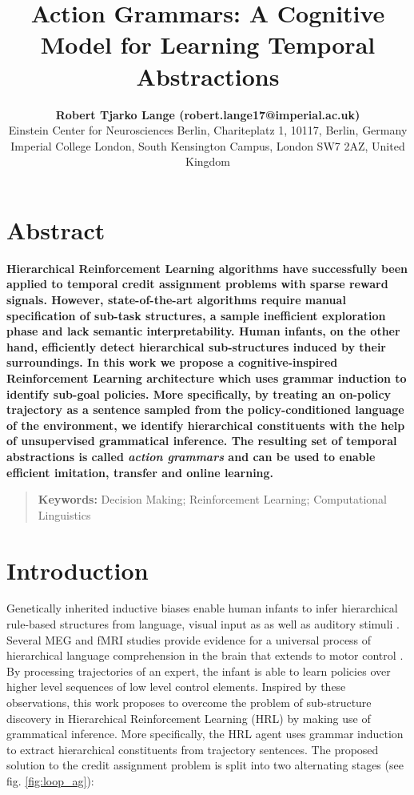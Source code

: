 \documentclass[10pt,letterpaper]{article}
\title{Action Grammars: A Cognitive Model for Learning Temporal Abstractions}
\author{{\large \bf Robert Tjarko Lange (robert.lange17@imperial.ac.uk)} \\
  Einstein Center for Neurosciences Berlin, Chariteplatz 1, 10117, Berlin, Germany \AND {\large \bf Aldo Faisal (a.faisal@imperial.ac.uk)} \\
  Imperial College London, South Kensington Campus, London SW7 2AZ, United Kingdom}
\begin{document}
\maketitle


\section{Abstract}
{
\bf
Hierarchical Reinforcement Learning algorithms have successfully been applied to temporal credit assignment problems with sparse reward signals. However, state-of-the-art algorithms require manual specification of sub-task structures, a sample inefficient exploration phase and lack semantic interpretability. Human infants, on the other hand, efficiently detect hierarchical sub-structures induced by their surroundings.
In this work we propose a cognitive-inspired Reinforcement Learning architecture which uses grammar induction to identify sub-goal policies. More specifically, by treating an on-policy trajectory as a sentence sampled from the policy-conditioned language of the environment, we identify hierarchical constituents with the help of unsupervised grammatical inference. The resulting set of temporal abstractions is called \textit{action grammars} \cite{Pastra_2012} and can be used to enable efficient imitation, transfer and online learning.
}
\begin{quote}
\small
\textbf{Keywords:} 
Decision Making; Reinforcement Learning; Computational Linguistics
\end{quote}

\section{Introduction}

Genetically inherited inductive biases enable human infants to infer hierarchical rule-based structures from language, visual input as as well as auditory stimuli \cite{Frank_2009, Marcus_2007}. Several MEG and fMRI studies provide evidence for a universal process of hierarchical language comprehension in the brain \cite{Frank_2018, Brennan_2016, Nelson_2017} that extends to motor control \cite{Pastra_2012, Stout_2018}. By processing trajectories of an expert, the infant is able to learn policies over higher level sequences of low level control elements.
Inspired by these observations, this work proposes to overcome the problem of sub-structure discovery in Hierarchical Reinforcement Learning (HRL) by making use of grammatical inference. More specifically, the HRL agent uses grammar induction to extract hierarchical constituents from trajectory sentences. The proposed solution to the credit assignment problem is split into two alternating stages (see fig. \ref{fig:loop_ag}):
\end{document}
